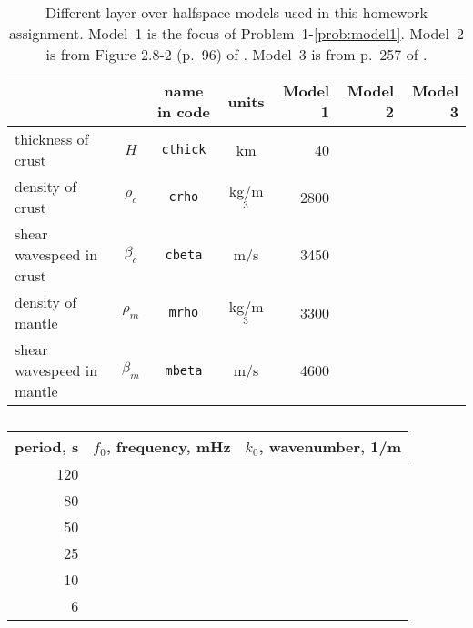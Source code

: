 \documentclass[11pt,titlepage,fleqn]{article}
\begin{document}
\clearpage\pagebreak

\pagestyle{empty}

\begin{table}
\vspace{-3cm}
\centering
\caption[]
{{
Different layer-over-halfspace models used in this homework assignment.
Model~1 is the focus of Problem~1-\ref{prob:model1}.
Model~2 is from  Figure 2.8-2 (p.~96) of \citet{SteinWysession}.
Model~3 is from p.~257 of \citet{AkiRichardsE2}.
\label{tab:models}
}}
\begin{spacing}{1.5}
\begin{tabular}{||l|c|c|c|r|r|r||}
\hline\hline
& & name in code & units & Model 1 & Model 2 & Model 3 \\
\hline\hline
thickness of crust        & $H$       & \verb+cthick+ & km       & 40 & & \\ \hline
density of crust          & $\rho_c$  & \verb+crho+   & kg/m$^3$ & 2800 & & \\ \hline
shear wavespeed in crust  & $\beta_c$ & \verb+cbeta+  & m/s      & 3450 & & \\ \hline
density of mantle         & $\rho_m$  & \verb+mrho+   & kg/m$^3$ & 3300 & & \\ \hline
shear wavespeed in mantle & $\beta_m$ & \verb+mbeta+  & m/s      & 4600 & & \\
\hline\hline
\end{tabular}
\end{spacing}
\end{table}

\begin{table}
\vspace{-5cm}
\centering
\caption[]
{{
\label{tab:k0}
}}
\begin{spacing}{1.5}
\begin{tabular}{r|r|r}
\hline\hline
period, s & $f_0$, frequency, mHz & $k_0$, wavenumber, 1/m  \\ \hline\hline
120 & & \\ \hline
80 & & \\ \hline
50 & &  \\ \hline
25 & & \\ \hline
10 & & \\ \hline
6 & &  \\ \hline
\end{tabular}
\end{spacing}
\end{table}
\end{document}
